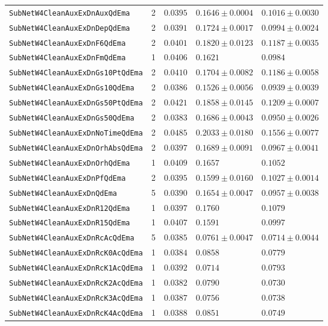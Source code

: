 \begin{longtable}{lrlll}
\texttt{SubNetW4CleanAuxExDnAuxQdEma} & 2 & $0.0395$ & $0.1646\pm0.0004$ & $0.1016\pm0.0030$\\
\texttt{SubNetW4CleanAuxExDnDepQdEma} & 2 & $0.0391$ & $0.1724\pm0.0017$ & $0.0994\pm0.0024$\\
\texttt{SubNetW4CleanAuxExDnF6QdEma} & 2 & $0.0401$ & $0.1820\pm0.0123$ & $0.1187\pm0.0035$\\
\texttt{SubNetW4CleanAuxExDnFmQdEma} & 1 & $0.0406$ & $0.1621$ & $0.0984$\\
\texttt{SubNetW4CleanAuxExDnGs10PtQdEma} & 2 & $0.0410$ & $0.1704\pm0.0082$ & $0.1186\pm0.0058$\\
\texttt{SubNetW4CleanAuxExDnGs10QdEma} & 2 & $0.0386$ & $0.1526\pm0.0056$ & $0.0939\pm0.0039$\\
\texttt{SubNetW4CleanAuxExDnGs50PtQdEma} & 2 & $0.0421$ & $0.1858\pm0.0145$ & $0.1209\pm0.0007$\\
\texttt{SubNetW4CleanAuxExDnGs50QdEma} & 2 & $0.0383$ & $0.1686\pm0.0043$ & $0.0950\pm0.0026$\\
\texttt{SubNetW4CleanAuxExDnNoTimeQdEma} & 2 & $0.0485$ & $0.2033\pm0.0180$ & $0.1556\pm0.0077$\\
\texttt{SubNetW4CleanAuxExDnOrhAbsQdEma} & 2 & $0.0397$ & $0.1689\pm0.0091$ & $0.0967\pm0.0041$\\
\texttt{SubNetW4CleanAuxExDnOrhQdEma} & 1 & $0.0409$ & $0.1657$ & $0.1052$\\
\texttt{SubNetW4CleanAuxExDnPfQdEma} & 2 & $0.0395$ & $0.1599\pm0.0160$ & $0.1027\pm0.0014$\\
\texttt{SubNetW4CleanAuxExDnQdEma} & 5 & $0.0390$ & $0.1654\pm0.0047$ & $0.0957\pm0.0038$\\
\texttt{SubNetW4CleanAuxExDnR12QdEma} & 1 & $0.0397$ & $0.1760$ & $0.1079$\\
\texttt{SubNetW4CleanAuxExDnR15QdEma} & 1 & $0.0407$ & $0.1591$ & $0.0997$\\
\texttt{SubNetW4CleanAuxExDnRcAcQdEma} & 5 & $0.0385$ & $0.0761\pm0.0047$ & $0.0714\pm0.0044$\\
\texttt{SubNetW4CleanAuxExDnRcK0AcQdEma} & 1 & $0.0384$ & $0.0858$ & $0.0779$\\
\texttt{SubNetW4CleanAuxExDnRcK1AcQdEma} & 1 & $0.0392$ & $0.0714$ & $0.0793$\\
\texttt{SubNetW4CleanAuxExDnRcK2AcQdEma} & 1 & $0.0382$ & $0.0790$ & $0.0730$\\
\texttt{SubNetW4CleanAuxExDnRcK3AcQdEma} & 1 & $0.0387$ & $0.0756$ & $0.0738$\\
\texttt{SubNetW4CleanAuxExDnRcK4AcQdEma} & 1 & $0.0388$ & $0.0851$ & $0.0749$\\

\end{longtable}
